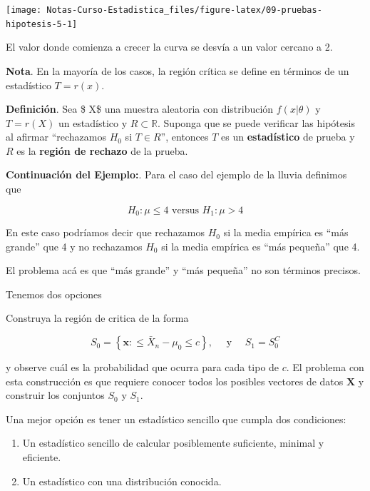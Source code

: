 \documentclass[
  12pt,
]{book}
\providecommand{\tightlist}{%
  \setlength{\itemsep}{0pt}\setlength{\parskip}{0pt}}
\begin{document}
\begin{center}\texttt{[image: Notas-Curso-Estadistica\_files/figure-latex/09-pruebas-hipotesis-5-1]} \end{center}

El valor donde comienza a crecer la curva se desvía a un valor cercano a 2.

\textbf{Nota}. En la mayoría de los casos, la región crítica se define en términos de
un estadístico \(T = r(x)\).

\textbf{Definición}. Sea \$ X\$ una muestra aleatoria con distribución \(f(x|\theta)\) y
\(T=r(X)\) un estadístico y \(R\subset \mathbb R\). Suponga que se puede verificar
las hipótesis al afirmar ``rechazamos \(H_0\) si \(T\in R\)'', entonces \(T\) es un
\textbf{estadístico} de prueba y \(R\) es la \textbf{región de rechazo} de la prueba.

\textbf{Continuación del Ejemplo:}. Para el caso del ejemplo de la lluvia definimos
que

\[
H_0: \mu \leq 4 \text{ versus } H_1: \mu > 4
\]

En este caso podríamos decir que rechazamos \(H_0\) si la media empírica
es ``más grande'' que 4 y no rechazamos \(H_0\) si la media empírica es ``más
pequeña'' que 4.

El problema acá es que ``más grande'' y ``más pequeña'' no son términos precisos.

Tenemos dos opciones

Construya la región de critica de la forma

\begin{equation} 
S_{0}=\left\{\boldsymbol{x}:\leq \bar{X}_{n}-\mu_{0} \leq
c\right\}, \quad \text { y } \quad S_{1}=S_{0}^{C} 
\end{equation}

y observe cuál es la probabilidad que ocurra para cada tipo de \(c\). El
problema con esta construcción es que requiere conocer todos los posibles
vectores de datos \(\mathbf{X}\) y construir los conjuntos \(S_0\) y \(S_1\).

Una mejor opción es tener un estadístico sencillo que cumpla dos condiciones:

\begin{enumerate}
\def\labelenumi{\arabic{enumi}.}
\tightlist
\item
  Un estadístico sencillo de calcular posiblemente suficiente, minimal y
  eficiente.
\item
  Un estadístico con una distribución conocida.
\end{enumerate}
\end{document}
